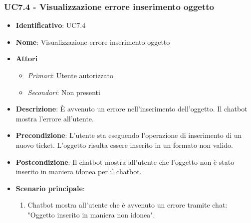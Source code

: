 \subsubsection{UC7.4 - Visualizzazione errore inserimento oggetto}
\begin{itemize}
	\item \textbf{Identificativo}: UC7.4
	\item \textbf{Nome}: Visualizzazione errore inserimento oggetto 
	\item \textbf{Attori}
	\begin{itemize} 
		\item \textit{Primari}: Utente autorizzato
		\item \textit{Secondari}: Non presenti
	\end{itemize}
	\item \textbf{Descrizione}: È avvenuto un errore nell'inserimento dell'oggetto. Il chatbot mostra l'errore all'utente.
	\item \textbf{Precondizione}: L'utente sta eseguendo l'operazione di inserimento di un nuovo ticket. L'oggetto risulta essere inserito in un formato non valido. 
	\item \textbf{Postcondizione}: Il chatbot mostra all'utente che l'oggetto non è stato inserito in maniera idonea per il chatbot.
	\item \textbf{Scenario principale}: \begin{enumerate}
		\item Chatbot mostra all'utente che è avvenuto un errore tramite chat: "Oggetto inserito in maniera non idonea".
		\end{enumerate}
\end{itemize}


